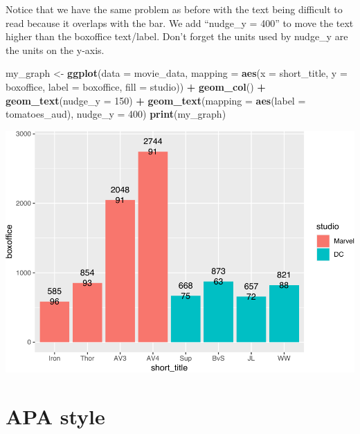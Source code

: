 \documentclass[
]{krantz}
\makeatletter
\newenvironment{Shaded}{\begin{snugshade}}{\end{snugshade}}
\newcommand{\DataTypeTok}[1]{\textcolor[rgb]{0.27,0.27,0.27}{#1}}
\newcommand{\DecValTok}[1]{\textcolor[rgb]{0.06,0.06,0.06}{#1}}
\newcommand{\KeywordTok}[1]{\textcolor[rgb]{0.27,0.27,0.27}{\textbf{#1}}}
\newcommand{\NormalTok}[1]{#1}
\newcommand{\OperatorTok}[1]{\textcolor[rgb]{0.43,0.43,0.43}{\textbf{#1}}}
\newcommand{\StringTok}[1]{\textcolor[rgb]{0.5,0.5,0.5}{#1}}
\newenvironment{kframe}{%
\medskip{}
\setlength{\fboxsep}{.8em}
 \def\at@end@of@kframe{}%
 \ifinner\ifhmode%
  \def\at@end@of@kframe{\end{minipage}}%
  \begin{minipage}{\columnwidth}%
 \fi\fi%
 \def\FrameCommand##1{\hskip\@totalleftmargin \hskip-\fboxsep
 \colorbox{shadecolor}{##1}\hskip-\fboxsep
     \hskip-\linewidth \hskip-\@totalleftmargin \hskip\columnwidth}%
 \MakeFramed {\advance\hsize-\width
   \@totalleftmargin\z@ \linewidth\hsize
   \@setminipage}}%
 {\par\unskip\endMakeFramed%
 \at@end@of@kframe}
\renewenvironment{Shaded}{\begin{kframe}}{\end{kframe}}
\makeatother
\begin{document}
Notice that we have the same problem as before with the text being difficult to read because it overlaps with the bar. We add ``nudge\_y = 400'' to move the text higher than the boxoffice text/label. Don't forget the units used by nudge\_y are the units on the y-axis.

\begin{Shaded}
\begin{Highlighting}[]
\NormalTok{my_graph <-}\StringTok{ }\KeywordTok{ggplot}\NormalTok{(}\DataTypeTok{data =}\NormalTok{ movie_data,}
           \DataTypeTok{mapping =} \KeywordTok{aes}\NormalTok{(}\DataTypeTok{x =}\NormalTok{ short_title,}
                         \DataTypeTok{y =}\NormalTok{ boxoffice,}
                         \DataTypeTok{label =}\NormalTok{ boxoffice, }
                         \DataTypeTok{fill =}\NormalTok{ studio)) }\OperatorTok{+}
\StringTok{  }\KeywordTok{geom_col}\NormalTok{() }\OperatorTok{+}
\StringTok{  }\KeywordTok{geom_text}\NormalTok{(}\DataTypeTok{nudge_y =} \DecValTok{150}\NormalTok{)  }\OperatorTok{+}
\StringTok{  }\KeywordTok{geom_text}\NormalTok{(}\DataTypeTok{mapping =} \KeywordTok{aes}\NormalTok{(}\DataTypeTok{label =}\NormalTok{ tomatoes_aud), }
            \DataTypeTok{nudge_y =} \DecValTok{400}\NormalTok{) }
\KeywordTok{print}\NormalTok{(my_graph)}
\end{Highlighting}
\end{Shaded}

\includegraphics{bookdown_files/figure-latex/unnamed-chunk-245-1.pdf}

\hypertarget{apa-style}{%
\section{APA style}\label{apa-style}}
\end{document}
